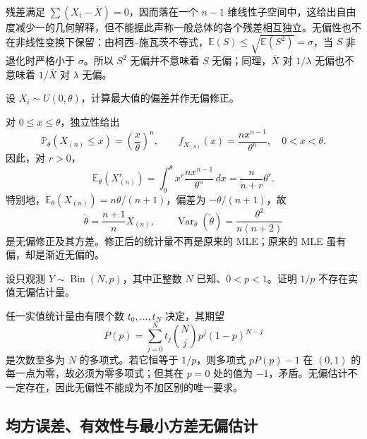 残差满足 $\sum(X_i-\overline X)=0$，因而落在一个 $n-1$ 维线性子空间中，这给出自由度减少一的几何解释，但不能据此声称一般总体的各个残差相互独立。无偏性也不在非线性变换下保留：由柯西--施瓦茨不等式，$\mathbb E(S)\le\sqrt{\mathbb E(S^2)}=\sigma$，当 $S$ 非退化时严格小于 $\sigma$。所以 $S^2$ 无偏并不意味着 $S$ 无偏；同理，$\overline X$ 对 $1/\lambda$ 无偏也不意味着 $1/\overline X$ 对 $\lambda$ 无偏。

\begin{example}
\label{ex:study-uniform-unbiased-correction}
设 $X_i\sim U(0,\theta)$，计算最大值的偏差并作无偏修正。
\end{example}

\begin{solve}
对 $0\le x\le\theta$，独立性给出
\[
  \mathbb P_\theta(X_{(n)}\le x)=\left(\frac x\theta\right)^n,
  \qquad
  f_{X_{(n)}}(x)=\frac{nx^{n-1}}{\theta^n},\quad0<x<\theta.
\]
因此，对 $r>0$，
\begin{equation}
  \mathbb E_\theta(X_{(n)}^r)
    =\int_0^\theta x^r\frac{nx^{n-1}}{\theta^n}\,dx
    =\frac n{n+r}\theta^r.
  \label{eq:study-uniform-maximum-moments}
\end{equation}
特别地，$\mathbb E_\theta(X_{(n)})=n\theta/(n+1)$，偏差为 $-\theta/(n+1)$，故
\begin{equation}
  \widetilde\theta=\frac{n+1}{n}X_{(n)},\qquad
  \operatorname{Var}_\theta(\widetilde\theta)
     =\frac{\theta^2}{n(n+2)}
  \label{eq:study-uniform-corrected-maximum}
\end{equation}
是无偏修正及其方差。修正后的统计量不再是原来的 MLE；原来的 MLE 虽有偏，却是渐近无偏的。
\end{solve}

\begin{example}
\label{ex:study-no-unbiased-reciprocal}
设只观测 $Y\sim\operatorname{Bin}(N,p)$，其中正整数 $N$ 已知、$0<p<1$。证明 $1/p$ 不存在实值无偏估计量。
\end{example}

\begin{solve}
任一实值统计量由有限个数 $t_0,\ldots,t_N$ 决定，其期望
\[
  P(p)=\sum_{j=0}^Nt_j\binom Njp^j(1-p)^{N-j}
\]
是次数至多为 $N$ 的多项式。若它恒等于 $1/p$，则多项式 $pP(p)-1$ 在 $(0,1)$ 的每一点为零，故必须为零多项式；但其在 $p=0$ 处的值为 $-1$，矛盾。无偏估计不一定存在，因此无偏性不能成为不加区别的唯一要求。
\end{solve}

\subsection{均方误差、有效性与最小方差无偏估计}

